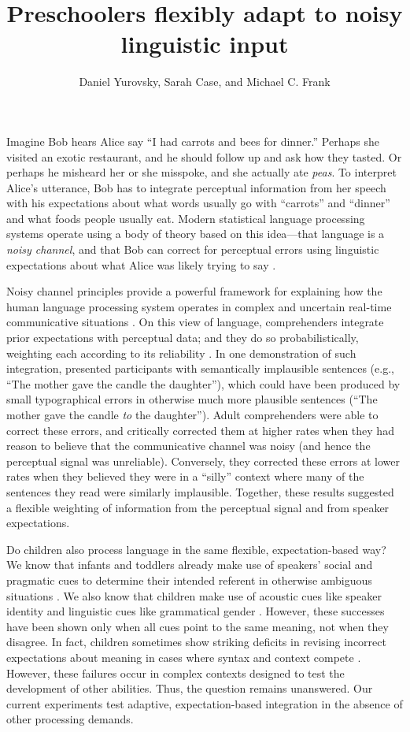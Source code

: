 \documentclass[man,floatsintext]{apa6}
\title{Preschoolers flexibly adapt to noisy linguistic input}
\author{Daniel Yurovsky, Sarah Case, and Michael C. Frank}
\affiliation{Stanford University}
\begin{document}
\maketitle

Imagine Bob hears Alice say ``I had carrots and bees for dinner.'' Perhaps she visited an exotic restaurant, and he should follow up and ask how they tasted. Or perhaps he misheard her or she misspoke, and she actually ate \emph{peas}. To interpret Alice's utterance, Bob has to integrate perceptual information from her speech with his expectations about what words usually go with ``carrots'' and ``dinner'' and what foods people usually eat. Modern statistical language processing systems operate using a body of theory based on this idea---that language is a \emph{noisy channel}, and that Bob can correct for perceptual errors using linguistic expectations about what Alice was likely trying to say \cite{jelinek1976, shannon1948}. 

Noisy channel principles provide a powerful framework for explaining how the human language processing system operates in complex and uncertain real-time communicative situations \cite{clayards2008, levy2008, jaeger2010, kleinschmidt2015}. On this view of language, comprehenders integrate prior expectations with perceptual data; and they do so probabilistically, weighting each according to its reliability \cite{ernst2002, jacobs1999}. In one demonstration of such integration,  presented participants with semantically implausible sentences (e.g., ``The mother gave the candle the daughter''), which could have been produced by small typographical errors in otherwise much more plausible sentences (``The mother gave the candle \emph{to} the daughter''). Adult comprehenders were able to correct these errors, and critically corrected them at higher rates when they had reason to believe that the communicative channel was noisy (and hence the perceptual signal was unreliable). Conversely, they corrected these errors at lower rates when they believed they were in a ``silly'' context where many of the sentences they read were similarly implausible. Together, these results suggested a flexible weighting of information from the perceptual signal and from speaker expectations. 

\pagebreak
Do children also process language in the same flexible, expectation-based way? We know that infants and toddlers already make use of speakers' social and pragmatic cues to determine their intended referent in otherwise ambiguous situations \cite{carpenter1998, clark2009}. We also know that children make use of acoustic cues like speaker identity and linguistic cues like grammatical gender \cite{lew-williams2007, creel2012}. However, these successes have been shown only when all cues point to the same meaning, not when they disagree. In fact, children sometimes show striking deficits in revising incorrect expectations about meaning in cases where syntax and context compete \cite{trueswell1999}. However, these failures occur in complex contexts designed to test the development of other abilities. Thus, the question remains unanswered. Our current experiments test adaptive, expectation-based integration in the absence of other processing demands. 
\end{document}
